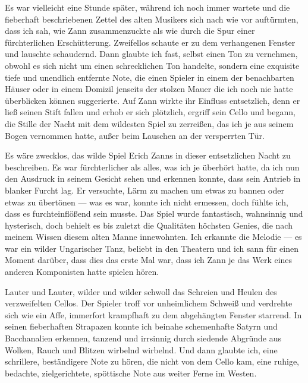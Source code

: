 \documentclass[a4paper]{memoir}
\begin{document}
Es war vielleicht eine Stunde später, während ich noch immer wartete und die fieberhaft beschriebenen Zettel des alten Musikers sich nach wie vor auftürmten, dass ich sah, wie Zann zusammenzuckte als wie durch die Spur einer fürchterlichen Erschütterung. Zweifellos schaute er zu dem verhangenen Fenster und lauschte schaudernd. Dann glaubte ich fast, selbst einen Ton zu vernehmen, obwohl es sich nicht um einen schrecklichen Ton handelte, sondern eine exquisite tiefe und unendlich entfernte Note, die einen Spieler in einem der benachbarten Häuser oder in einem Domizil jenseits der stolzen Mauer die ich noch nie hatte überblicken können suggerierte. Auf Zann wirkte ihr Einfluss entsetzlich, denn er ließ seinen Stift fallen und erhob er sich plötzlich, ergriff sein Cello und begann, die Stille der Nacht mit dem wildesten Spiel zu zerreißen, das ich je aus seinem Bogen vernommen hatte, außer beim Lauschen an der versperrten Tür.

Es wäre zwecklos, das wilde Spiel Erich Zanns in dieser entsetzlichen Nacht zu beschreiben. Es war fürchterlicher als alles, was ich je überhört hatte, da ich nun den Ausdruck in seinem Gesicht sehen und erkennen konnte, dass sein Antrieb in blanker Furcht lag. Er versuchte, Lärm zu machen um etwas zu bannen oder etwas zu übertönen --- was es war, konnte ich nicht ermessen, doch fühlte ich, dass es furchteinflößend sein musste. Das Spiel wurde fantastisch, wahnsinnig und hysterisch, doch behielt es bis zuletzt die Qualitäten höchsten Genies, die nach meinem Wissen diesem alten Manne innewohnten. Ich erkannte die Melodie --- es war ein wilder Ungarischer Tanz, beliebt in den Theatern und ich sann für einen Moment darüber, dass dies das erste Mal war, dass ich Zann je das Werk eines anderen Komponisten hatte spielen hören.

Lauter und Lauter, wilder und wilder schwoll das Schreien und Heulen des verzweifelten Cellos. Der Spieler troff vor unheimlichem Schweiß und verdrehte sich wie ein Affe, immerfort krampfhaft zu dem abgehängten Fenster starrend. In seinen fieberhaften Strapazen konnte ich beinahe schemenhafte Satyrn und Bacchanalien erkennen, tanzend und irrsinnig durch siedende Abgründe aus Wolken, Rauch und Blitzen wirbelnd wirbelnd. Und dann glaubte ich, eine schrillere, beständigere Note zu hören, die nicht von dem Cello kam, eine ruhige, bedachte, zielgerichtete, spöttische Note aus weiter Ferne im Westen.
\end{document}

